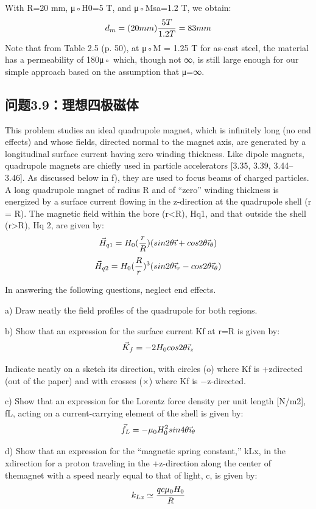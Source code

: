 With R=20 mm, μ◦H0=5 T, and μ◦Msa=1.2 T, we obtain:
$$d_{m}=(20mm)\frac{5T}{1.2T}=83mm\\$$
Note that from Table 2.5 (p. 50), at μ◦M = 1.25 T for as-cast steel, the material
has a permeability of 180μ◦ which, though not ∞, is still large enough for our
simple approach based on the assumption that μ=∞.
\newpage

\subsection{问题3.9：理想四极磁体}
This problem studies an ideal quadrupole magnet, which is infinitely long (no end
effects) and whose fields, directed normal to the magnet axis, are generated by a
longitudinal surface current having zero winding thickness. Like dipole magnets,
quadrupole magnets are chiefly used in particle accelerators [3.35, 3.39, 3.44–3.46].
As discussed below in f), they are used to focus beams of charged particles.
A long quadrupole magnet of radius R and of “zero” winding thickness is energized
by a surface current flowing in the z-direction at the quadrupole shell (r = R).
The magnetic field within the bore (r<R), Hq1, and that outside the shell (r>R),
Hq
2, are given by:
$$
\vec{H}_{q1}=H_{0}(\frac{r}{R})(sin2\theta\vec{\imath}+cos2\theta\vec{\imath}_{\theta})\\%
$$
$$
\vec{H}_{q2}=H_{0}(\frac{R}{r})^{3}(sin2\theta\vec{\imath}_{r}-cos2\theta\vec{\imath}_{\theta})\\%
$$

In answering the following questions, neglect end effects.

a) Draw neatly the field profiles of the quadrupole for both regions.

b) Show that an expression for the surface current Kf at r=R is given by:
$$
\vec{K}_{f}=-2H_{0}cos2\theta\vec{\imath}_{z}\\%
$$

Indicate neatly on a sketch its direction, with circles (o) where Kf is +zdirected (out of the paper) and with crosses (×) where Kf is −z-directed.

c) Show that an expression for the Lorentz force density per unit length [N/m2],
fL, acting on a current-carrying element of the shell is given by:
$$
\vec{f}_{L}=-\mu_{0}H_{0}^{2}sin4\theta\vec{\imath}_{\theta}\\%
$$

d) Show that an expression for the “magnetic spring constant,” kLx, in the xdirection for a proton traveling in the +z-direction along the center of themagnet with a speed nearly equal to that of light, c, is given by:
$$
k_{Lx}\simeq\frac{qc\mu_{0}H_{0}}{R}\\%
$$

